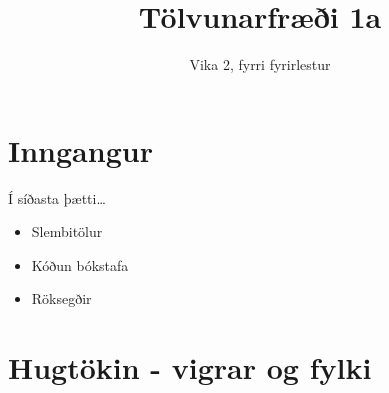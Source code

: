 \documentclass[handout]{beamer}
\title{Tölvunarfræði 1a}
\subtitle{Vika 2, fyrri fyrirlestur}
\begin{document}
\begin{frame}
\titlepage
\end{frame}

\section{Inngangur}

\begin{frame}{Í síðasta þætti\ldots}
\begin{itemize}
 \item Slembitölur
 \item Kóðun bókstafa
 \item Röksegðir
\end{itemize}
\end{frame}

\section{Hugtökin - vigrar og fylki}
\end{document}
